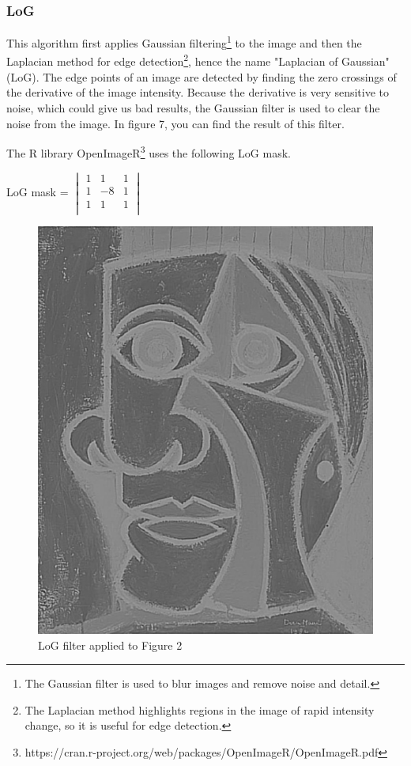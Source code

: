 \documentclass[12pt]{article}
\begin{document}
\subsubsection{LoG}
This algorithm first applies Gaussian filtering\footnote{The Gaussian filter is used to blur images and remove noise and detail.} to the image and then the Laplacian method for edge detection\footnote{The Laplacian method highlights regions in the image of rapid intensity change, so it is useful for edge detection.}, hence the name "Laplacian of Gaussian" (LoG).
The edge points of an image are detected by finding the zero crossings of the  derivative of the image intensity. Because the  derivative is very sensitive to noise, which could give us bad results, the Gaussian filter is used to clear the noise from the image. In figure 7, you can find the result of this filter.
\newline

The R library OpenImageR\footnote{https://cran.r-project.org/web/packages/OpenImageR/OpenImageR.pdf} uses the following LoG mask.
\newline

LoG mask = $\begin{vmatrix}
        1 & 1 & 1\\
        1 & -8 & 1\\
        1 & 1 & 1\\
\end{vmatrix}$

\begin{figure}[h]
\centering
\includegraphics[scale = 0.39]{img/picassoLoG}
\caption{LoG filter applied to Figure 2}
\end{figure}
\end{document}
